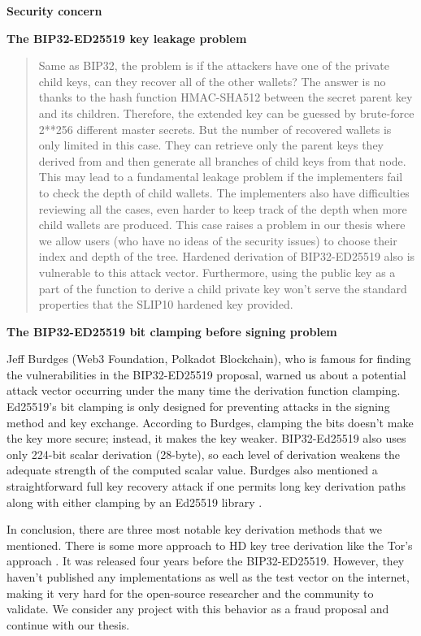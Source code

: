 \bigskip
{\textbf{Security concern}}
\begin{adjustwidth}{0.5cm}{}
    \bigskip
    {\textbf{The BIP32-ED25519 key leakage problem}}
    \begin{quote}
        Same as BIP32, the problem is if the attackers have one of the private child keys, can they recover all of the other wallets? The answer is no thanks to the hash function HMAC-SHA512 between the secret parent key and its children. Therefore, the extended key can be guessed by brute-force 2**256 different master secrets. But the number of recovered wallets is only limited in this case. They can retrieve only the parent keys they derived from and then generate all branches of child keys from that node. This may lead to a fundamental leakage problem if the implementers fail to check the depth of child wallets. The implementers also have difficulties reviewing all the cases, even harder to keep track of the depth when more child wallets are produced. This case raises a problem in our thesis where we allow users (who have no ideas of the security issues) to choose their index and depth of the tree. Hardened derivation of BIP32-ED25519 also is vulnerable to this attack vector. Furthermore, using the public key as a part of the function to derive a child private key won’t serve the standard properties that the SLIP10 hardened key provided.
    \end{quote}

    \bigskip
    {\textbf{The BIP32-ED25519 bit clamping before signing problem}}

    Jeff Burdges (Web3 Foundation, Polkadot Blockchain), who is famous for finding the vulnerabilities in the BIP32-ED25519 proposal, warned us about a potential attack vector occurring under the many time the derivation function clamping. Ed25519’s bit clamping is only designed for preventing attacks in the signing method and key exchange. According to Burdges, clamping the bits doesn’t make the key more secure; instead, it makes the key weaker. BIP32-Ed25519 also uses only 224-bit scalar derivation (28-byte), so each level of derivation weakens the adequate strength of the computed scalar value.
    Burdges also mentioned a straightforward full key recovery attack if one permits long key derivation paths along with either clamping by an Ed25519 library \cite{Jeff}.

\end{adjustwidth}

In conclusion, there are three most notable key derivation methods that we mentioned. There is some more approach to HD key tree derivation like the Tor’s approach \cite{torspec}. It was released four years before the BIP32-ED25519. However, they haven’t published any implementations as well as the test vector on the internet, making it very hard for the open-source researcher and the community to validate. We consider any project with this behavior as a fraud proposal and continue with our thesis.

